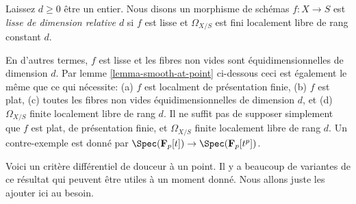 \begin{definition}

\label{definition-smooth-relative-dimension}
Laissez $d \geq 0$ être un entier. Nous disons un morphisme de schémas $f : X \to S$ est {\it lisse de dimension relative $d$} si $f$ est lisse et $\Omega_{X/S}$ est fini localement libre de rang constant $d$.
\end{definition}

\noindent
En d'autres termes, $f$ est lisse et les fibres non vides sont équidimensionnelles de dimension $d$. Par lemme \ref{lemma-smooth-at-point} ci-dessous ceci est également le même que ce qui nécessite: (a) $f$ est localment de présentation finie, (b) $f$ est plat, (c) toutes les fibres non vides équidimensionnelles de dimension $d$, et (d) $\Omega_{X/S}$ finite localement libre de rang $d$. Il ne suffit pas de supposer simplement que $f$ est plat, de présentation finie, et $\Omega_{X/S}$ finite localement libre de rang $d$. Un contre-exemple est donné par $\Spec(\mathbf{F}_p[t]) \to \Spec(\mathbf{F}_p[t^p])$.

\medskip\noindent
Voici un critère différentiel de douceur à un point. Il y a beaucoup de variantes de ce résultat qui peuvent être utiles à un moment donné. Nous allons juste les ajouter ici au besoin.

